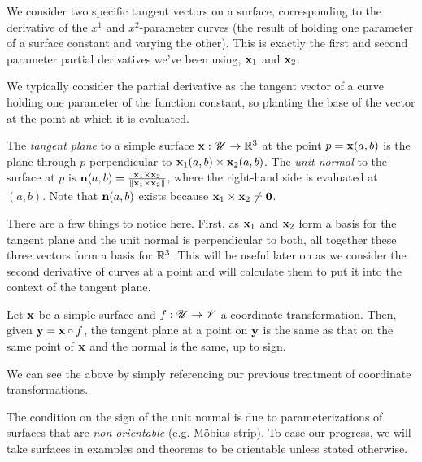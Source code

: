   We consider two specific tangent vectors on a surface, corresponding to the derivative of the $x^1$ and $x^2$-parameter curves (the result of holding one parameter of a surface constant and varying the other). This is exactly the first and second parameter partial derivatives we've been using, $\mathbf{x}_1$ and $\mathbf{x}_2$.

  \begin{unno_rem}
    We typically consider the partial derivative as the tangent vector of a curve holding one parameter of the function constant, so planting the base of the vector at the point at which it is evaluated.
  \end{unno_rem}

  \begin{defn}
    The \emph{tangent plane} to a simple surface  $\mathbf{x}: \mathscr{U} \to \mathbb{R}^3$ at the point $p = \mathbf{x}(a, b)$ is the plane through $p$ perpendicular to $\mathbf{x}_1(a, b) \times \mathbf{x}_2(a, b)$. The \emph{unit normal} to the surface at $p$ is $\mathbf{n}(a, b) = \frac{\mathbf{x}_1 \times \mathbf{x}_2}{\lVert\mathbf{x}_1 \times \mathbf{x}_2\rVert}$, where the right-hand side is evaluated at $(a, b)$. Note that $\mathbf{n}(a, b)$ exists because $\mathbf{x}_1 \times \mathbf{x}_2 \neq \mathbf{0}$.
  \end{defn}

  \begin{unno_rem}
    There are a few things to notice here. First, as $\mathbf{x}_1$ and $\mathbf{x}_2$ form a basis for the tangent plane and the unit normal is perpendicular to both, all together these three vectors form a basis for $\mathbb{R}^3$. This will be useful later on as we consider the second derivative of curves at a point and will calculate them to put it into the context of the tangent plane.
  \end{unno_rem}

  \begin{prop}
    Let $\mathbf{x}$ be a simple surface and $f:\mathscr{U}\to\mathscr{V}$ a coordinate transformation. Then, given $\mathbf{y} = \mathbf{x} \circ f$, the tangent plane at a point on $\mathbf{y}$ is the same as that on the same point of $\mathbf{x}$ and the normal is the same, up to sign.
  \end{prop}

  We can see the above by simply referencing our previous treatment of coordinate transformations.

  The condition on the sign of the unit normal is due to parameterizations of surfaces that are \emph{non-orientable} (e.g. Möbius strip). To ease our progress, we will take surfaces in examples and theorems to be orientable unless stated otherwise.

